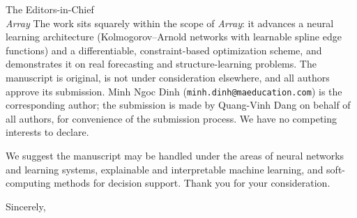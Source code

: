 \documentclass[11pt]{letter}
\begin{document}
\begin{letter}{The Editors-in-Chief \\ \emph{Array}}
The work sits squarely within the scope of \emph{Array}: it
advances a neural learning architecture (Kolmogorov--Arnold networks with
learnable spline edge functions) and a differentiable, constraint-based
optimization scheme, and demonstrates it on real forecasting and structure-learning
problems. The manuscript is original, is not under consideration elsewhere, and all
authors approve its submission. Minh Ngoc Dinh (\texttt{minh.dinh@maeducation.com}) is the corresponding author; the submission is made by Quang-Vinh Dang on behalf of all authors, for convenience of the submission process. We have no competing interests to declare.

We suggest the manuscript may be handled under the areas of neural networks and
learning systems, explainable and interpretable machine learning, and soft-computing
methods for decision support. Thank you for your consideration.

\closing{Sincerely,}

\end{letter}
\end{document}
